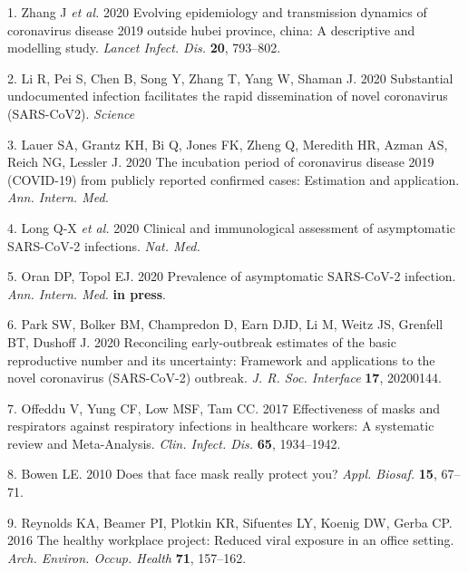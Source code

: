 \documentclass[
]{article}
\newenvironment{cslreferences}%
  {}%
  {\par}
\begin{document}
\hypertarget{refs}{}
\begin{cslreferences}
\leavevmode\hypertarget{ref-Zhang2020-ih}{}%
1. Zhang J \emph{et al.} 2020 Evolving epidemiology and transmission
dynamics of coronavirus disease 2019 outside hubei province, china: A
descriptive and modelling study. \emph{Lancet Infect. Dis.} \textbf{20},
793--802.

\leavevmode\hypertarget{ref-Li2020-hc}{}%
2. Li R, Pei S, Chen B, Song Y, Zhang T, Yang W, Shaman J. 2020
Substantial undocumented infection facilitates the rapid dissemination
of novel coronavirus (SARS-CoV2). \emph{Science}

\leavevmode\hypertarget{ref-Lauer2020-mr}{}%
3. Lauer SA, Grantz KH, Bi Q, Jones FK, Zheng Q, Meredith HR, Azman AS,
Reich NG, Lessler J. 2020 The incubation period of coronavirus disease
2019 (COVID-19) from publicly reported confirmed cases: Estimation and
application. \emph{Ann. Intern. Med.}

\leavevmode\hypertarget{ref-Long2020-ny}{}%
4. Long Q-X \emph{et al.} 2020 Clinical and immunological assessment of
asymptomatic SARS-CoV-2 infections. \emph{Nat. Med.}

\leavevmode\hypertarget{ref-Oran2020-aq}{}%
5. Oran DP, Topol EJ. 2020 Prevalence of asymptomatic SARS-CoV-2
infection. \emph{Ann. Intern. Med.} \textbf{in press}.

\leavevmode\hypertarget{ref-Park2020-vl}{}%
6. Park SW, Bolker BM, Champredon D, Earn DJD, Li M, Weitz JS, Grenfell
BT, Dushoff J. 2020 Reconciling early-outbreak estimates of the basic
reproductive number and its uncertainty: Framework and applications to
the novel coronavirus (SARS-CoV-2) outbreak. \emph{J. R. Soc. Interface}
\textbf{17}, 20200144.

\leavevmode\hypertarget{ref-Offeddu2017-ae}{}%
7. Offeddu V, Yung CF, Low MSF, Tam CC. 2017 Effectiveness of masks and
respirators against respiratory infections in healthcare workers: A
systematic review and Meta-Analysis. \emph{Clin. Infect. Dis.}
\textbf{65}, 1934--1942.

\leavevmode\hypertarget{ref-Bowen2010-ht}{}%
8. Bowen LE. 2010 Does that face mask really protect you? \emph{Appl.
Biosaf.} \textbf{15}, 67--71.

\leavevmode\hypertarget{ref-Reynolds2016-oy}{}%
9. Reynolds KA, Beamer PI, Plotkin KR, Sifuentes LY, Koenig DW, Gerba
CP. 2016 The healthy workplace project: Reduced viral exposure in an
office setting. \emph{Arch. Environ. Occup. Health} \textbf{71},
157--162.


\end{cslreferences}
\end{document}
